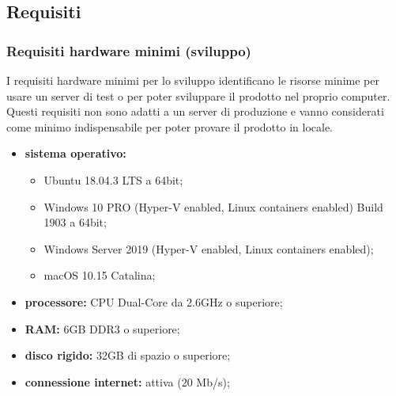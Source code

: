 \subsection{Requisiti}
	\subsubsection{Requisiti hardware minimi (sviluppo)}
	I requisiti hardware minimi per lo sviluppo identificano le risorse minime per usare un server di test o per poter sviluppare il prodotto nel proprio computer. Questi requisiti non sono adatti a un server di produzione e vanno considerati come minimo indispensabile per poter provare il prodotto in locale.
		\begin{itemize}
			\item \textbf{sistema operativo:} 
			\begin{itemize}
				\item Ubuntu 18.04.3 LTS a 64bit;
				\item Windows 10 PRO (Hyper-V enabled, Linux containers enabled) Build 1903 a 64bit; 
				\item Windows Server 2019 (Hyper-V enabled, Linux containers enabled);
				\item macOS 10.15 Catalina;
			\end{itemize}
			\item \textbf{processore:} CPU Dual-Core da 2.6GHz o superiore;
			\item \textbf{RAM:} 6GB DDR3 o superiore;
			\item \textbf{disco rigido:} 32GB di spazio o superiore;
			\item \textbf{connessione internet:} attiva (20 Mb/s);
		\end{itemize}

